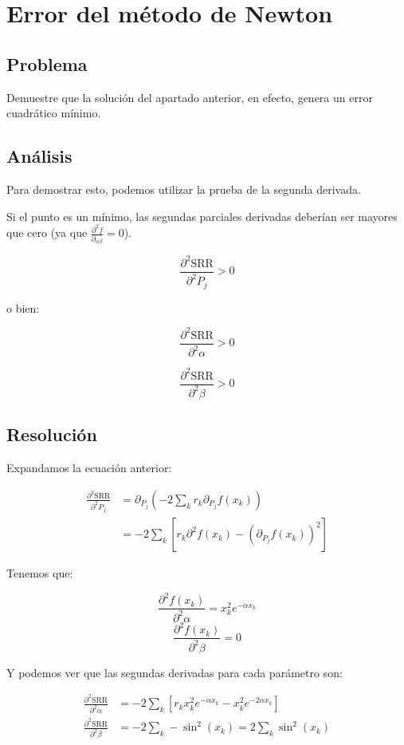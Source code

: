 \section{Error del método de Newton}

\subsection{Problema}

Demuestre que la solución del apartado anterior, en efecto, genera un error cuadrático mínimo.

\subsection{Análisis}

Para demostrar esto, podemos utilizar la prueba de la segunda derivada. 

Si el punto es un mínimo, las segundas parciales derivadas deberían ser mayores que cero (ya que $\frac{ \partial^2 f }{\partial_{\alpha \beta}} = 0$).

\begin{equation*}
	\frac{\partial^2 \text{SRR}}{\partial^2 P_j } > 0
\end{equation*}

o bien:

$$
	\frac{\partial^2 \text{SRR}}{\partial^2 \alpha } > 0
$$

$$
\frac{\partial^2 \text{SRR}}{\partial^2 \beta } > 0
$$

\subsection{Resolución}

Expandamos la ecuación anterior:

\begin{align*}
	\frac{\partial^2 \text{SRR}}{\partial^2 P_j } &=
	\partial_{P_j} (-2 \sum_k r_k \partial_{P_j} f(x_k)) \\
	&= -2 \sum_k 
		[ r_k \partial^2 f(x_k) - (\partial_{P_j} f(x_k))^2 ]
\end{align*}

Tenemos que:

$$
\frac{\partial^2 f(x_k) }{\partial^2 \alpha} = x_k^2 e^{-\alpha x_k}
$$
$$
\frac{\partial^2 f(x_k) }{\partial^2 \beta} = 0
$$

Y podemos ver que las segundas derivadas para cada parámetro son:


\begin{align*}
	\frac{\partial^2 \text{SRR}}{\partial^2 \alpha } &=
	-2 \sum_{k} [ r_k  x_k^2 e^{-\alpha x_k} -  x_k^2 e^{-2\alpha x_k}] \\
	\frac{\partial^2 \text{SRR}}{\partial^2 \beta} &=
	-2 \sum_{k} -\sin^2(x_k) = 2 \sum_{k} \sin^2(x_k)
\end{align*}

